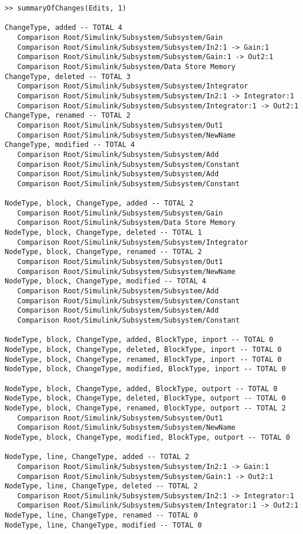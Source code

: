 \documentclass{article}
\begin{document}
\begin{lstlisting}
>> summaryOfChanges(Edits, 1)

ChangeType, added -- TOTAL 4
   Comparison Root/Simulink/Subsystem/Subsystem/Gain
   Comparison Root/Simulink/Subsystem/Subsystem/In2:1 -> Gain:1
   Comparison Root/Simulink/Subsystem/Subsystem/Gain:1 -> Out2:1
   Comparison Root/Simulink/Subsystem/Data Store Memory
ChangeType, deleted -- TOTAL 3
   Comparison Root/Simulink/Subsystem/Subsystem/Integrator
   Comparison Root/Simulink/Subsystem/Subsystem/In2:1 -> Integrator:1
   Comparison Root/Simulink/Subsystem/Subsystem/Integrator:1 -> Out2:1
ChangeType, renamed -- TOTAL 2
   Comparison Root/Simulink/Subsystem/Subsystem/Out1
   Comparison Root/Simulink/Subsystem/Subsystem/NewName
ChangeType, modified -- TOTAL 4
   Comparison Root/Simulink/Subsystem/Subsystem/Add
   Comparison Root/Simulink/Subsystem/Subsystem/Constant
   Comparison Root/Simulink/Subsystem/Subsystem/Add
   Comparison Root/Simulink/Subsystem/Subsystem/Constant

NodeType, block, ChangeType, added -- TOTAL 2
   Comparison Root/Simulink/Subsystem/Subsystem/Gain
   Comparison Root/Simulink/Subsystem/Data Store Memory
NodeType, block, ChangeType, deleted -- TOTAL 1
   Comparison Root/Simulink/Subsystem/Subsystem/Integrator
NodeType, block, ChangeType, renamed -- TOTAL 2
   Comparison Root/Simulink/Subsystem/Subsystem/Out1
   Comparison Root/Simulink/Subsystem/Subsystem/NewName
NodeType, block, ChangeType, modified -- TOTAL 4
   Comparison Root/Simulink/Subsystem/Subsystem/Add
   Comparison Root/Simulink/Subsystem/Subsystem/Constant
   Comparison Root/Simulink/Subsystem/Subsystem/Add
   Comparison Root/Simulink/Subsystem/Subsystem/Constant

NodeType, block, ChangeType, added, BlockType, inport -- TOTAL 0
NodeType, block, ChangeType, deleted, BlockType, inport -- TOTAL 0
NodeType, block, ChangeType, renamed, BlockType, inport -- TOTAL 0
NodeType, block, ChangeType, modified, BlockType, inport -- TOTAL 0

NodeType, block, ChangeType, added, BlockType, outport -- TOTAL 0
NodeType, block, ChangeType, deleted, BlockType, outport -- TOTAL 0
NodeType, block, ChangeType, renamed, BlockType, outport -- TOTAL 2
   Comparison Root/Simulink/Subsystem/Subsystem/Out1
   Comparison Root/Simulink/Subsystem/Subsystem/NewName
NodeType, block, ChangeType, modified, BlockType, outport -- TOTAL 0

NodeType, line, ChangeType, added -- TOTAL 2
   Comparison Root/Simulink/Subsystem/Subsystem/In2:1 -> Gain:1
   Comparison Root/Simulink/Subsystem/Subsystem/Gain:1 -> Out2:1
NodeType, line, ChangeType, deleted -- TOTAL 2
   Comparison Root/Simulink/Subsystem/Subsystem/In2:1 -> Integrator:1
   Comparison Root/Simulink/Subsystem/Subsystem/Integrator:1 -> Out2:1
NodeType, line, ChangeType, renamed -- TOTAL 0
NodeType, line, ChangeType, modified -- TOTAL 0
\end{lstlisting}
\end{document}
